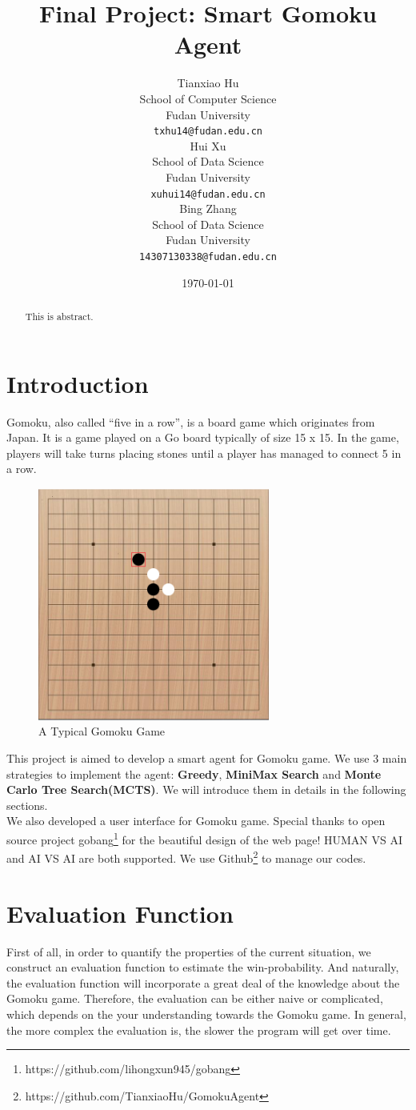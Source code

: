 \documentclass[11pt,a4paper]{article}
\title{Final Project: Smart Gomoku Agent}
\author{Tianxiao Hu \\
  School of Computer Science\\
  Fudan University\\
  {\tt txhu14@fudan.edu.cn} \\\And
  Hui Xu \\
  School of Data Science\\
  Fudan University\\
  {\tt xuhui14@fudan.edu.cn} \\\And
  Bing Zhang \\
  School of Data Science\\
  Fudan University\\
  {\tt 14307130338@fudan.edu.cn}
}
\date{\today}
\begin{document}
\maketitle
\begin{abstract}
  This is abstract.
\end{abstract}

\section{Introduction}
Gomoku, also called ``five in a row'', is a board game which originates from Japan. It is a game played on a Go board typically of size 15 x 15. In the game, players will take turns placing stones until a player has managed to connect 5 in a row.

\begin{figure}[!ht]
\centering\includegraphics[width=3in]{2.png}
\caption{A Typical Gomoku Game}
\end{figure} 

This project is aimed to develop a smart agent for Gomoku game. We use 3 main strategies to implement the agent: \textbf{Greedy}, \textbf{MiniMax Search} and \textbf{Monte Carlo Tree Search(MCTS)}. We will introduce them in details in the following sections.\\
We also developed a user interface for Gomoku game. Special thanks to open source project gobang\footnote{https://github.com/lihongxun945/gobang} for the beautiful design of the web page! HUMAN VS AI and AI VS AI are both supported. We use Github\footnote{https://github.com/TianxiaoHu/GomokuAgent} to manage our codes.

\section{Evaluation Function}
First of all, in order to quantify the properties of the current situation, we construct an evaluation function to estimate the win-probability. And naturally, the evaluation function will incorporate a great deal of the knowledge about the Gomoku game. Therefore, the evaluation can be either naive or complicated, which depends on the your understanding towards the Gomoku game. In general, the more complex the evaluation is, the slower the program will get over time.
\end{document}
